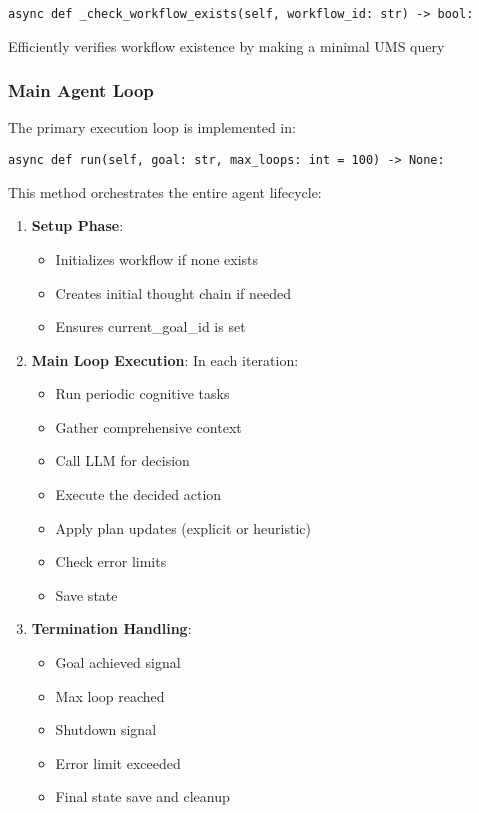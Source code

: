 \documentclass[12pt,a4paper]{article}
\begin{document}
\begin{pageablecode}
\begin{verbatim}
async def _check_workflow_exists(self, workflow_id: str) -> bool:
\end{verbatim}
\end{pageablecode}
Efficiently verifies workflow existence by making a minimal UMS query

\subsubsection*{Main Agent Loop}

The primary execution loop is implemented in:
\begin{pageablecode}
\begin{verbatim}
async def run(self, goal: str, max_loops: int = 100) -> None:
\end{verbatim}
\end{pageablecode}
This method orchestrates the entire agent lifecycle:

\begin{enumerate}[label=\arabic*.]
    \item \textbf{Setup Phase}:
    \begin{itemize}
        \item Initializes workflow if none exists
        \item Creates initial thought chain if needed
        \item Ensures current\_goal\_id is set
    \end{itemize}

    \item \textbf{Main Loop Execution}: In each iteration:
    \begin{itemize}
        \item Run periodic cognitive tasks
        \item Gather comprehensive context
        \item Call LLM for decision
        \item Execute the decided action
        \item Apply plan updates (explicit or heuristic)
        \item Check error limits
        \item Save state
    \end{itemize}

    \item \textbf{Termination Handling}:
    \begin{itemize}
        \item Goal achieved signal
        \item Max loop reached
        \item Shutdown signal
        \item Error limit exceeded
        \item Final state save and cleanup
    \end{itemize}
\end{enumerate}
\end{document}
